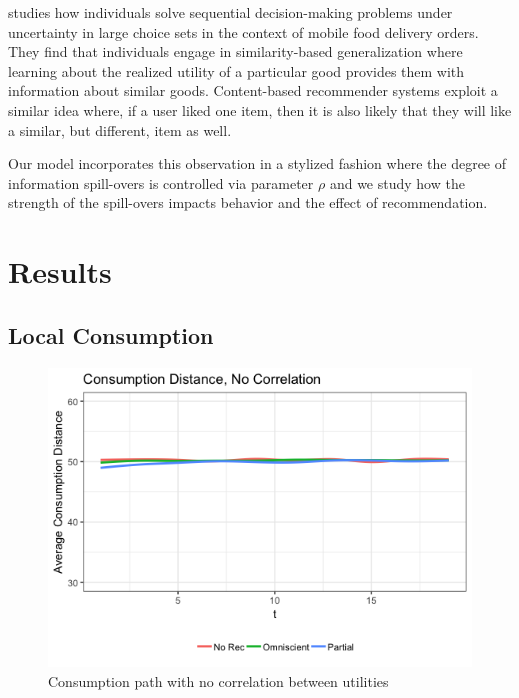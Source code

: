 \documentclass[sigconf]{acmart}
\begin{document}
\indent \cite{schulz2019structured} studies how individuals solve sequential decision-making problems under uncertainty in large choice sets in the context of mobile food delivery orders. They find that individuals engage in similarity-based generalization where learning about the realized utility of a particular good provides them with information about similar goods. Content-based recommender systems exploit a similar idea where, if a user liked one item, then it is also likely that they will like a similar, but different, item as well.

Our model incorporates this observation in a stylized fashion where the degree of information spill-overs is controlled via parameter $\rho$ and we study how the strength of the spill-overs impacts behavior and the effect of recommendation.


\section{Results}

\subsection{Local Consumption}

\begin{figure}
\includegraphics[scale=0.4]{figures/consumption_dist_N_200T_20no_correlation}
\caption{Consumption path with no correlation between utilities}
\label{fig:no_correlation_consumption_path}
\end{figure}
\end{document}
